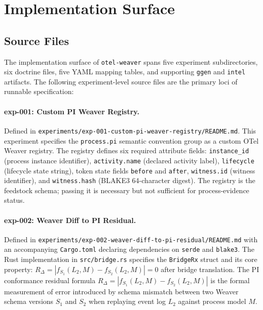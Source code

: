 
\section{Implementation Surface}
\label{sec:otel-weaver-impl}

\subsection{Source Files}
\label{sec:otel-weaver-impl-sources}

The implementation surface of \texttt{otel-weaver} spans five experiment subdirectories, six
doctrine files, five YAML mapping tables, and supporting \texttt{ggen} and \texttt{intel}
artifacts. The following experiment-level source files are the primary loci of runnable
specification:

\paragraph{exp-001: Custom PI Weaver Registry.}
Defined in \texttt{experiments/exp-001-custom-pi-weaver-registry/README.md}. This experiment
specifies the \texttt{process.pi} semantic convention group as a custom OTel Weaver registry.
The registry defines six required attribute fields: \texttt{instance\_id} (process instance
identifier), \texttt{activity.name} (declared activity label), \texttt{lifecycle} (lifecycle
state string), token state fields \texttt{before} and \texttt{after}, \texttt{witness.id}
(witness identifier), and \texttt{witness.hash} (BLAKE3 64-character digest). The registry
is the feedstock schema; passing it is necessary but not sufficient for process-evidence status.

\paragraph{exp-002: Weaver Diff to PI Residual.}
Defined in \texttt{experiments/exp-002-weaver-diff-to-pi-residual/README.md} with an accompanying
\texttt{Cargo.toml} declaring dependencies on \texttt{serde} and \texttt{blake3}. The Rust
implementation in \texttt{src/bridge.rs} specifies the \texttt{BridgeRx} struct and its
core property: $R_\Delta = |f_{S_1}(L_2, M) - f_{S_2}(L_2, M)| = 0$ after bridge translation.
The PI conformance residual formula $R_\Delta = |f_{S_1}(L_2, M) - f_{S_2}(L_2, M)|$ is the
formal measurement of error introduced by schema mismatch between two Weaver schema versions
$S_1$ and $S_2$ when replaying event log $L_2$ against process model $M$.

